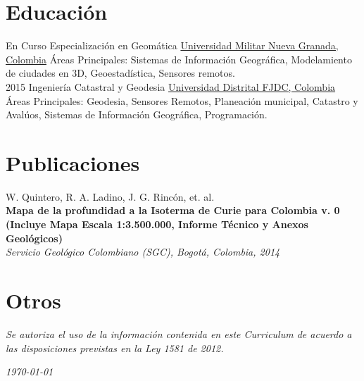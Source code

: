 \documentclass[]{friggeri-cv}
\begin{document}
\section{Educación}
\begin{entrylist}
  \entry
    {En Curso}
    {Especialización en Geomática}
    {\href{http://www.umng.edu.co/web/guest/programas-academicos/facultad-ingenieria/posgrados/especializaciones/especializacion-geomatica}{Universidad Militar Nueva Granada, Colombia}}
    {Áreas Principales: Sistemas de Información Geográfica, Modelamiento de ciudades en 3D, Geoestadística, Sensores remotos.\\
    }
  \entry
    {2015}
    {Ingeniería Catastral y Geodesia}
    {\href{https://www.udistrital.edu.co/dependencias/tipica.php?id=85}{Universidad Distrital FJDC, Colombia}}
    {Áreas Principales: Geodesia, Sensores Remotos, Planeación municipal, Catastro y Avalúos, Sistemas de Información Geográfica, Programación.\\
    }
\end{entrylist}




\section{Publicaciones}
W. Quintero, R. A. Ladino, J. G. Rincón, et. al.\\
\textbf{Mapa de la profundidad a la Isoterma de Curie para Colombia v. 0 \\ \scriptsize{(Incluye Mapa Escala 1:3.500.000, Informe Técnico y Anexos Geológicos)}}\\
\emph{Servicio Geológico Colombiano (SGC), Bogotá, Colombia, 2014}
\\
\section{Otros}
\emph{Se autoriza el uso de la información contenida en este Curriculum de acuerdo a las disposiciones previstas en la Ley 1581 de 2012.}
\\
\begin{flushleft}
\emph{\today}
\end{flushleft}
\end{document}

